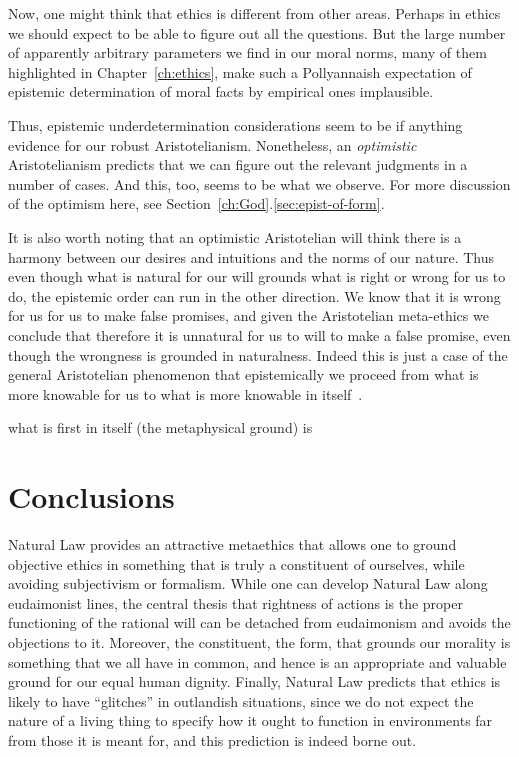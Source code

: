 Now, one might think that ethics is different from other areas. Perhaps in ethics we should expect to be able
to figure out all the questions. But the large number of apparently arbitrary parameters we find in our moral
norms, many of them highlighted in Chapter~\ref{ch:ethics}, make such a Pollyannaish expectation of epistemic
determination of moral facts by empirical ones implausible. 

Thus, epistemic underdetermination considerations seem to be if anything evidence for our robust
Aristotelianism.
Nonetheless, an \textit{optimistic} Aristotelianism predicts that we can figure out the relevant judgments
in a number of cases. And this, too, seems to be what we observe. For more discussion of the optimism here,
see Section~\ref{ch:God}.\ref{sec:epist-of-form}.

It is also worth noting that an optimistic Aristotelian will think there is a harmony between our
desires and intuitions and the norms of our nature. Thus even though what is natural for our will
grounds what is right or wrong for us to do, the epistemic order can run in the other direction. We 
know that it is wrong for us for us to make false promises, and given the Aristotelian meta-ethics
we conclude that therefore it is unnatural for us to will to make a false promise, even though
the wrongness is grounded in naturalness. Indeed this is just a case of the
general Aristotelian phenomenon that epistemically we proceed from what is more knowable for us to what is more
knowable in itself~\parencite[I.1]{AristotlePhys14}.

what is first in itself (the metaphysical ground) is 

\section{Conclusions}
Natural Law provides an attractive metaethics that allows one to ground objective ethics in something that is truly
a constituent of ourselves, while avoiding subjectivism or formalism. 
While one can develop Natural Law along eudaimonist lines, the central thesis that rightness of actions is
the proper functioning of the rational will can be detached from eudaimonism and avoids the objections to it.
Moreover, the constituent, the form, that grounds our morality is something that we all have in common, and 
hence is an appropriate and valuable ground for our equal human dignity. Finally, Natural Law predicts that
ethics is likely to have ``glitches'' in outlandish situations, since we do not expect the nature of a living
thing to specify how it ought to function in environments far from those it is meant for, and this prediction
is indeed borne out.

\chaptertail 